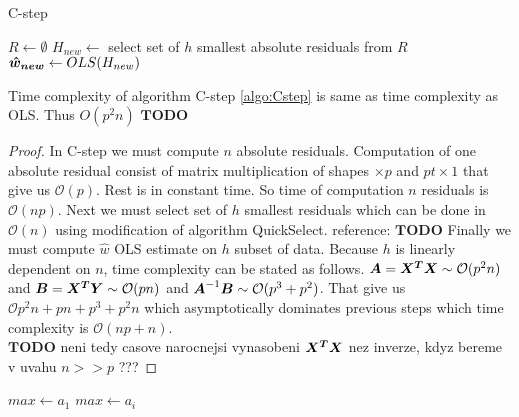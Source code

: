 \begin{algorithm}[H]
	\label{algo:Cstep}
	\caption{C-step}
	
	$R \gets \emptyset$\;
	$H_{new} \gets $ select set of $h$ smallest absolute residuals from $R$\;
	$\boldsymbol{\hat{w}_{new}} \gets OLS(H_{new})$\;
	\;
\end{algorithm}

\begin{observation} 
	Time complexity of algorithm C-step \ref{algo:Cstep} is same as time complexity as OLS. Thus $O(p^2n)$
	$\boldsymbol{{TODO}}$
\end{observation} 

\begin{proof}
	In C-step we must compute $n$ absolute residuals. Computation of one absolute residual consist of
	matrix multiplication of shapes $ \times p$ and $p t\times 1$ that give us $\mathcal{O}(p)$. Rest is in constant time.
	So time of computation $n$ residuals is $\mathcal{O}(np)$.
	Next we must select set of $h$ smallest residuals which can be done in $\mathcal{O}(n)$ using modification 
	of algorithm QuickSelect. reference: $\boldsymbol{{TODO}}$
	Finally we must compute $\hat{w}$ OLS estimate on $h$ subset of data.
	Because $h$ is linearly dependent on $n$, time complexity can be stated as follows.
	$\m{A} = \m{X^T}\m{X} \sim \mathcal{O}(p^2n)$ and
	$\m{B} = \m{X^T}\m{Y} \sim \mathcal{O}(pn)$ and
	$\m{A}^{-1}\m{B} \sim \mathcal{O}(p^3 + p^2)$.
	That give us $\mathcal{O}{p^2n + pn + p^3 + p^2n}$ which asymptotically dominates previous steps
	which time complexity is $\mathcal{O}(np+n)$.\\
	$\boldsymbol{{TODO}}$ neni tedy casove narocnejsi vynasobeni $\m{X^T}\m{X}$ nez inverze, kdyz bereme v uvahu $n >> p$ ???
\end{proof}

\begin{observation} 
\end{observation} 

\begin{algorithm}
	\DontPrintSemicolon %
	$max \gets a_1$\;
	 {
	   {
		$max \gets a_i$\;
	  }
	}
	\;
	\label{algo:max}
	\end{algorithm}
	
